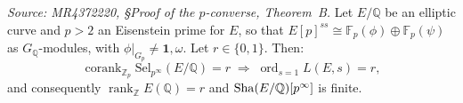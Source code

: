 \begin{theorem}
  \label{thm:thmB}
  \textit{Source: MR4372220, \S{}Proof of the $p$-converse, Theorem~B.}
  Let $E/\mathbb{Q}$ be an elliptic curve and $p > 2$ an Eisenstein prime for $E$,
  so that $E[p]^{ss} \cong \mathbb{F}_p(\phi) \oplus \mathbb{F}_p(\psi)$ as
  $G_{\mathbb{Q}}$-modules, with $\phi|_{G_p} \neq \mathbf{1}, \omega$.
  Let $r \in \{0, 1\}$. Then:
  \[
    \operatorname{corank}_{\mathbb{Z}_p} \mathrm{Sel}_{p^\infty}(E/\mathbb{Q}) = r
    \;\Longrightarrow\;
    \operatorname{ord}_{s=1} L(E, s) = r,
  \]
  and consequently $\operatorname{rank}_{\mathbb{Z}} E(\mathbb{Q}) = r$ and
  $\operatorname{Sha}(E/\mathbb{Q})[p^\infty]$ is finite.
\end{theorem}

